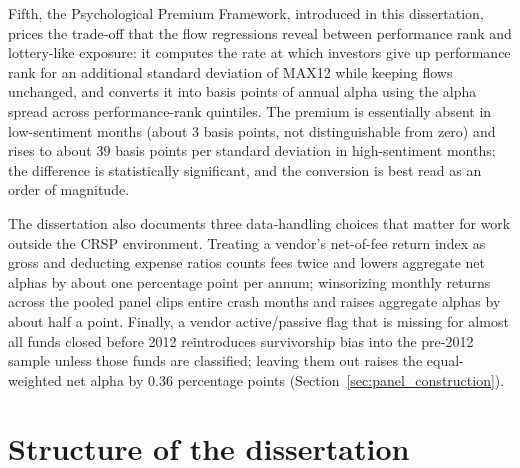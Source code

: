 \documentclass[12pt, oneside]{report}
\begin{document}
Fifth, the Psychological Premium Framework, introduced in this dissertation, prices the trade-off that the flow regressions reveal between performance rank and lottery-like exposure: it computes the rate at which investors give up performance rank for an additional standard deviation of MAX12 while keeping flows unchanged, and converts it into basis points of annual alpha using the alpha spread across performance-rank quintiles. The premium is essentially absent in low-sentiment months (about 3 basis points, not distinguishable from zero) and rises to about 39 basis points per standard deviation in high-sentiment months; the difference is statistically significant, and the conversion is best read as an order of magnitude.

The dissertation also documents three data-handling choices that matter for work outside the CRSP environment. Treating a vendor’s net-of-fee return index as gross and deducting expense ratios counts fees twice and lowers aggregate net alphas by about one percentage point per annum; winsorizing monthly returns across the pooled panel clips entire crash months and raises aggregate alphas by about half a point. Finally, a vendor active/passive flag that is missing for almost all funds closed before 2012 reintroduces survivorship bias into the pre-2012 sample unless those funds are classified; leaving them out raises the equal-weighted net alpha by 0.36 percentage points (Section~\ref{sec:panel_construction}). 

\section{Structure of the dissertation}
\label{sec:structure}
\end{document}
